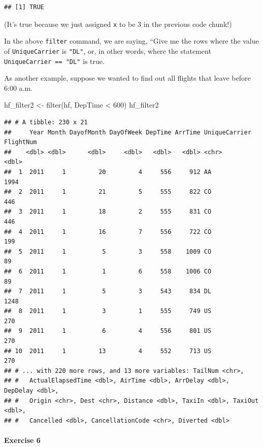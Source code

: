 \documentclass[
]{book}
\newenvironment{Shaded}{\begin{snugshade}}{\end{snugshade}}
\newcommand{\DecValTok}[1]{\textcolor[rgb]{0.00,0.00,0.81}{#1}}
\newcommand{\FunctionTok}[1]{\textcolor[rgb]{0.00,0.00,0.00}{#1}}
\newcommand{\NormalTok}[1]{#1}
\newcommand{\OtherTok}[1]{\textcolor[rgb]{0.56,0.35,0.01}{#1}}
\newcommand{\SpecialCharTok}[1]{\textcolor[rgb]{0.00,0.00,0.00}{#1}}
\begin{document}
\begin{verbatim}
## [1] TRUE
\end{verbatim}

(It's true because we just assigned \texttt{x} to be 3 in the previous code chunk!)

In the above \texttt{filter} command, we are saying, ``Give me the rows where the value of \texttt{UniqueCarrier} is \texttt{"DL"}, or, in other words, where the statement \texttt{UniqueCarrier\ ==\ "DL"} is true.

As another example, suppose we wanted to find out all flights that leave before 6:00 a.m.

\begin{Shaded}
\begin{Highlighting}[]
\NormalTok{hf\_filter2 }\OtherTok{\textless{}{-}} \FunctionTok{filter}\NormalTok{(hf, DepTime }\SpecialCharTok{\textless{}} \DecValTok{600}\NormalTok{)}
\NormalTok{hf\_filter2}
\end{Highlighting}
\end{Shaded}

\begin{verbatim}
## # A tibble: 230 x 21
##     Year Month DayofMonth DayOfWeek DepTime ArrTime UniqueCarrier FlightNum
##    <dbl> <dbl>      <dbl>     <dbl>   <dbl>   <dbl> <chr>             <dbl>
##  1  2011     1         20         4     556     912 AA                 1994
##  2  2011     1         21         5     555     822 CO                  446
##  3  2011     1         18         2     555     831 CO                  446
##  4  2011     1         16         7     556     722 CO                  199
##  5  2011     1          5         3     558    1009 CO                   89
##  6  2011     1          1         6     558    1006 CO                   89
##  7  2011     1          5         3     543     834 DL                 1248
##  8  2011     1          3         1     555     749 US                  270
##  9  2011     1          6         4     556     801 US                  270
## 10  2011     1         13         4     552     713 US                  270
## # ... with 220 more rows, and 13 more variables: TailNum <chr>,
## #   ActualElapsedTime <dbl>, AirTime <dbl>, ArrDelay <dbl>, DepDelay <dbl>,
## #   Origin <chr>, Dest <chr>, Distance <dbl>, TaxiIn <dbl>, TaxiOut <dbl>,
## #   Cancelled <dbl>, CancellationCode <chr>, Diverted <dbl>
\end{verbatim}

\hypertarget{exercise-6}{%
\paragraph*{Exercise 6}\label{exercise-6}}
\end{document}
